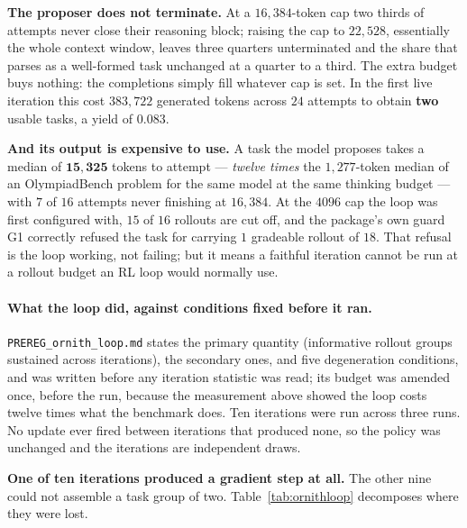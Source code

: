 \textbf{The proposer does not terminate.} At a $16{,}384$-token cap two thirds of attempts
never close their reasoning block; raising the cap to $22{,}528$, essentially the whole
context window, leaves three quarters unterminated and the share that parses as a well-formed
task unchanged at a quarter to a third. The extra budget buys nothing: the completions simply
fill whatever cap is set. In the first live iteration this cost $383{,}722$ generated tokens
across $24$ attempts to obtain \textbf{two} usable tasks, a yield of $0.083$.

\textbf{And its output is expensive to use.} A task the model proposes takes a median of
$\mathbf{15{,}325}$ tokens to attempt --- \emph{twelve times} the $1{,}277$-token median of an
OlympiadBench problem for the same model at the same thinking budget --- with $7$ of $16$
attempts never finishing at $16{,}384$. At the $4096$ cap the loop was first configured with,
$15$ of $16$ rollouts are cut off, and the package's own guard G1 correctly refused the task
for carrying $1$ gradeable rollout of $18$. That refusal is the loop working, not failing; but
it means a faithful iteration cannot be run at a rollout budget an RL loop would normally use.

\paragraph{What the loop did, against conditions fixed before it ran.}
\texttt{PREREG\_ornith\_loop.md} states the primary quantity (informative rollout groups
sustained across iterations), the secondary ones, and five degeneration conditions, and was
written before any iteration statistic was read; its budget was amended once, before the run,
because the measurement above showed the loop costs twelve times what the benchmark does.
Ten iterations were run across three runs. No update ever fired between iterations that
produced none, so the policy was unchanged and the iterations are independent draws.

\textbf{One of ten iterations produced a gradient step at all.} The other nine could not
assemble a task group of two. Table~\ref{tab:ornithloop} decomposes where they were lost.

